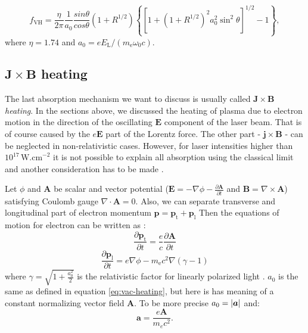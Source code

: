 \begin{equation}
	\label{eq:vac-heating}
	f_{\mathrm{VH}} = \frac{\eta}{2\pi}\frac{1}{a_0}\frac{sin\theta}{cos\theta}\left(1+R^{1/2}\right)\left\{\left[1+\left(1+R^{1/2}\right)^2a_0^2\sin^2\theta\right]^{1/2}-1\right\},
\end{equation}
where $\eta = 1.74$ and $a_0 = eE_\mathrm{L}/(m_\mathrm{e}\omega_0c)$.

\subsection*{$\bm{J}\times \bm{B}$ heating}
The last absorption mechanism we want to discuss is usually called $\bm{J}\times \bm{B}$ \textit{heating}. In the sections above, we discussed the heating of plasma due to electron motion in the direction of the oscillating $\bm{E}$ component of the laser beam. That is of course caused by the $e\bm{E}$ part of the Lorentz force. The other part - $\bm{j \times B}$ - can be neglected in non-relativistic cases. However, for laser intensities higher than $10^{17}\,\mathrm{W.cm}^{-2}$ it is not possible to explain all absorption using the classical limit and another consideration has to be made \cite{cai2006}.

Let $\phi$ and $\bm{A}$ be scalar and vector potential ($\bm{E} = -\nabla \phi -\frac{\partial \bm{A}}{\partial t}$ and $\bm{B} = \nabla \times \bm{A}$) satisfying Coulomb gauge $\nabla \cdot \bm{A} = 0$. Also, we can separate transverse and longitudinal part of electron momentum $\bm{p} = \bm{p}_\mathrm{t}+\bm{p}_\mathrm{l}$  Then the equations of motion for electron can be written as \cite{cai2006}:
\begin{equation}
	\frac{\partial \bm{p}_\mathrm{t}}{\partial t} = \frac{e}{c} \frac{\partial \bm{A}}{\partial t}
	\label{eq:jxb1}
\end{equation}
\begin{equation}
	\frac{\partial \bm{p}_\mathrm{l}}{\partial t} = e\nabla \phi - m_{\mathrm{e}}c^2\nabla (\gamma-1)
	\label{eq:jxb2}
\end{equation}
where $\gamma = \sqrt{1+\frac{a_0^2}{2}}$ is the relativistic factor for linearly polarized light \cite{absorption2}. $a_0$ is the same as defined in equation \ref{eq:vac-heating}, but here is has meaning of a constant normalizing vector field $\bm{A}$. To be more precise $a_0 = \lvert \bm{a} \rvert$ and:
\begin{equation}
	\bm{a} = \frac{e\bm{A}}{m_ec^2}.
\end{equation}

